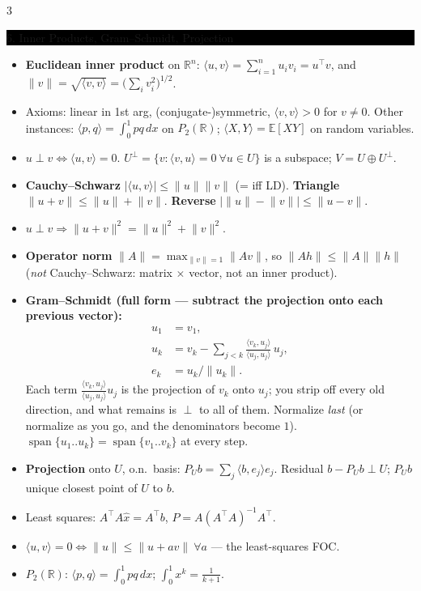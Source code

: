 \documentclass[8pt,letterpaper]{article}
\makeatletter
\newcommand{\sect}[1]{%
  \vspace{2.2pt}%
  \noindent\colorbox{black}{\parbox{\dimexpr\linewidth-2\fboxsep}{%
    \color{white}\bfseries\scshape\fontsize{6.4}{7.4}\selectfont
    \hyphenpenalty=10000\exhyphenpenalty=10000\raggedright #1}}%
  \vspace{1.4pt}\par\nopagebreak\@afterheading}
\newenvironment{tl}
  {\begin{itemize}[leftmargin=6pt,itemsep=0.3pt,topsep=1pt,parsep=0pt,
                   partopsep=0pt,label=\textcolor{gray}{\tiny$\bullet$}]}
  {\end{itemize}}
\newcommand{\R}{\mathbb{R}}
\newcommand{\Rn}{\mathbb{R}^n}
\newcommand{\E}{\mathbb{E}}
\newcommand{\spn}{\operatorname{span}}
\newcommand{\tp}{^{\!\top}}
\newcommand{\ip}[2]{\langle #1,#2\rangle}
\newcommand{\nm}[1]{\lVert #1\rVert}
\makeatother
\begin{document}
\begin{multicols}{3}
\sect{6. Inner Products, Gram--Schmidt, Projection}
\begin{tl}
\item \textbf{Euclidean inner product} on $\Rn$: $\ip{u}{v}=\sum_{i=1}^n u_iv_i=u\tp v$, and $\nm{v}=\sqrt{\ip{v}{v}}=\big(\sum_i v_i^2\big)^{1/2}$.
\item Axioms: linear in 1st arg, (conjugate-)symmetric, $\ip{v}{v}>0$ for $v\neq0$. Other instances: $\ip{p}{q}=\int_0^1pq\,dx$ on $P_2(\R)$; $\ip{X}{Y}=\E[XY]$ on random variables.
\item $u\perp v\iff\ip{u}{v}=0$. $U^\perp=\{v:\ip{v}{u}=0\ \forall u\in U\}$ is a subspace; $V=U\oplus U^\perp$.
\item \textbf{Cauchy--Schwarz} $|\ip{u}{v}|\le\nm{u}\nm{v}$ (= iff LD). \textbf{Triangle} $\nm{u+v}\le\nm{u}+\nm{v}$. \textbf{Reverse} $\big|\nm{u}-\nm{v}\big|\le\nm{u-v}$.
\item $u\perp v\Rightarrow\nm{u+v}^2=\nm{u}^2+\nm{v}^2$.
\item \textbf{Operator norm} $\nm{A}=\max_{\nm{v}=1}\nm{Av}$, so $\nm{Ah}\le\nm{A}\nm{h}$ (\emph{not} Cauchy--Schwarz: matrix $\times$ vector, not an inner product).
\item \textbf{Gram--Schmidt (full form --- subtract the projection onto each previous vector):}
\begin{align*}
u_1&=v_1,\\
u_k&=v_k-\sum_{j<k}\frac{\ip{v_k}{u_j}}{\ip{u_j}{u_j}}\,u_j,\\
e_k&=u_k/\nm{u_k}.
\end{align*}
Each term $\frac{\ip{v_k}{u_j}}{\ip{u_j}{u_j}}u_j$ is the projection of $v_k$ onto $u_j$; you strip off every old direction, and what remains is $\perp$ to all of them. Normalize \emph{last} (or normalize as you go, and the denominators become $1$). $\spn\{u_1..u_k\}=\spn\{v_1..v_k\}$ at every step.
\item \textbf{Projection} onto $U$, o.n.\ basis: $P_Ub=\sum_j\ip{b}{e_j}e_j$. Residual $b-P_Ub\perp U$; $P_Ub$ unique closest point of $U$ to $b$.
\item Least squares: $A\tp A\hat x=A\tp b$, $P=A(A\tp A)^{-1}A\tp$.
\item \textbf{$\ip{u}{v}=0\iff\nm{u}\le\nm{u+av}\ \forall a$} --- the least-squares FOC.
\item $P_2(\R)$: $\ip{p}{q}=\int_0^1pq\,dx$; $\int_0^1x^k=\frac{1}{k+1}$.
\end{tl}


\end{multicols}
\end{document}
